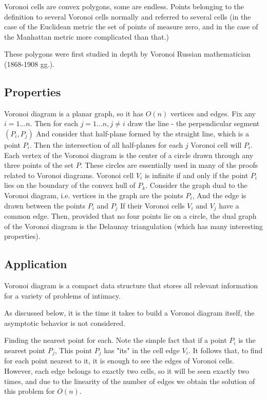 Voronoi cells are convex polygons, some are endless. Points belonging to the definition to several Voronoi cells normally and referred to several cells (in the case of the Euclidean metric the set of points of measure zero, and in the case of the Manhattan metric more complicated than that.)

These polygons were first studied in depth by Voronoi Russian mathematician (1868-1908 gg.).

\subsection{ Properties }

Voronoi diagram is a planar graph, so it has $O (n)$ vertices and edges.
Fix any $i = 1 \ldots n$. Then for each $j = 1 \ldots n, j \ne i$ draw the line - the perpendicular segment $(P_i, P_j)$ And consider that half-plane formed by the straight line, which is a point $P_i$. Then the intersection of all half-planes for each $j$ Voronoi cell will $P_i$.
Each vertex of the Voronoi diagram is the center of a circle drawn through any three points of the set $P$. These circles are essentially used in many of the proofs related to Voronoi diagrams.
Voronoi cell $V_i$ is infinite if and only if the point $P_i$ lies on the boundary of the convex hull of $P_k$.
Consider the graph dual to the Voronoi diagram, i.e. vertices in the graph are the points $P_i$, And the edge is drawn between the points $P_i$ and $P_j$ If their Voronoi cells $V_i$ and $V_j$ have a common edge. Then, provided that no four points lie on a circle, the dual graph of the Voronoi diagram is the Delaunay triangulation (which has many interesting properties).
\subsection{ Application }

Voronoi diagram is a compact data structure that stores all relevant information for a variety of problems of intimacy.

As discussed below, it is the time it takes to build a Voronoi diagram itself, the asymptotic behavior is not considered.

Finding the nearest point for each.
Note the simple fact that if a point $P_i$ is the nearest point $P_j$, This point $P_j$ has "its" in the cell edge $V_i$. It follows that, to find for each point nearest to it, it is enough to see the edges of Voronoi cells. However, each edge belongs to exactly two cells, so it will be seen exactly two times, and due to the linearity of the number of edges we obtain the solution of this problem for $O (n)$.

